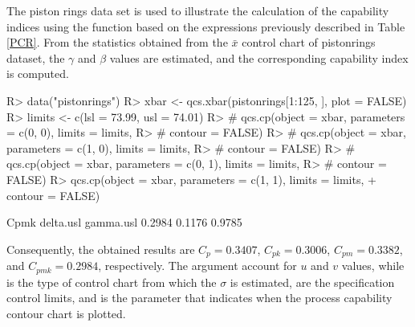 The piston rings data set is used to illustrate the calculation of the capability indices using the  function based on the expressions previously described in Table \ref{PCR}. From the statistics obtained from the $\bar{x}$ control chart of pistonrings dataset, the $\gamma$ and $\beta$ values are estimated, and the corresponding capability index is computed.
\begin{example}
R> data("pistonrings")
R> xbar <- qcs.xbar(pistonrings[1:125, ], plot = FALSE)
R> limits <- c(lsl = 73.99, usl = 74.01)
R> # qcs.cp(object = xbar, parameters = c(0, 0), limits = limits, 
R> #        contour = FALSE)
R> # qcs.cp(object = xbar, parameters = c(1, 0), limits = limits, 
R> #        contour = FALSE)
R> # qcs.cp(object = xbar, parameters = c(0, 1), limits = limits, 
R> #        contour = FALSE)
R> qcs.cp(object = xbar, parameters = c(1, 1), limits = limits, 
+         contour = FALSE)
\end{example}
\begin{example}
     Cpmk delta.usl gamma.usl 
   0.2984    0.1176    0.9785 
\end{example}

Consequently, the obtained results are $ C_p=0.3407$, $C_{pk}=0.3006$, $C_{pm}=0.3382$, and $ C_{pmk}=0.2984$, respectively. The argument  account for $u$ and $v$ values, while  is the type of control chart from which the $\sigma$ is estimated,  are the specification control limits, and  is the parameter that indicates when the process capability contour chart is plotted.

